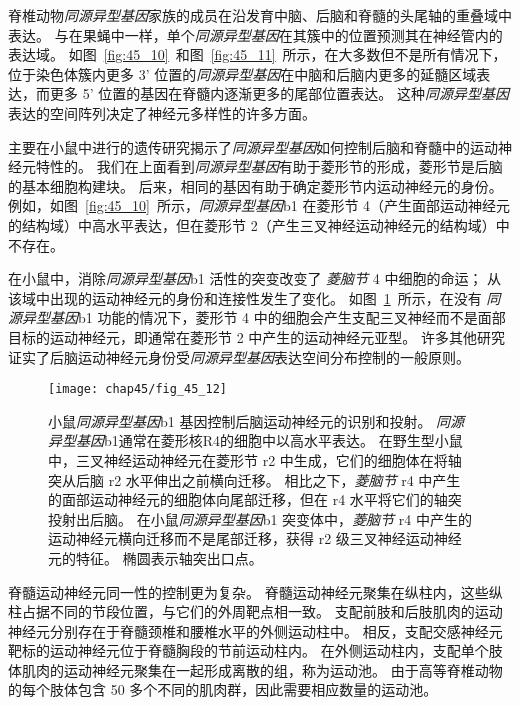 脊椎动物\textit{同源异型基因}家族的成员在沿发育中脑、后脑和脊髓的头尾轴的重叠域中表达。
与在果蝇中一样，单个\textit{同源异型基因}在其簇中的位置预测其在神经管内的表达域。
如图~\ref{fig:45_10}~和图~\ref{fig:45_11}~所示，在大多数但不是所有情况下，位于染色体簇内更多 3' 位置的\textit{同源异型基因}在中脑和后脑内更多的延髓区域表达，而更多 5' 位置的基因在脊髓内逐渐更多的尾部位置表达。
这种\textit{同源异型基因}表达的空间阵列决定了神经元多样性的许多方面。


主要在小鼠中进行的遗传研究揭示了\textit{同源异型基因}如何控制后脑和脊髓中的运动神经元特性的。
我们在上面看到\textit{同源异型基因}有助于菱形节的形成，菱形节是后脑的基本细胞构建块。
后来，相同的基因有助于确定菱形节内运动神经元的身份。
例如，如图~\ref{fig:45_10}~所示，\textit{同源异型基因}b1 在菱形节 4（产生面部运动神经元的结构域）中高水平表达，但在菱形节 2（产生三叉神经运动神经元的结构域）中不存在。


在小鼠中，消除\textit{同源异型基因}b1 活性的突变改变了 \textit{菱脑节} 4 中细胞的命运；
从该域中出现的运动神经元的身份和连接性发生了变化。 
如图~\ref{fig:45_12}~所示，在没有 \textit{同源异型基因}b1 功能的情况下，菱形节 4 中的细胞会产生支配三叉神经而不是面部目标的运动神经元，即通常在菱形节 2 中产生的运动神经元亚型。
许多其他研究证实了后脑运动神经元身份受\textit{同源异型基因}表达空间分布控制的一般原则。


\begin{figure}[htbp]
	\centering
	\texttt{[image: chap45/fig\_45\_12]}
	\caption{小鼠\textit{同源异型基因}b1 基因控制后脑运动神经元的识别和投射。
		\textit{同源异型基因}b1通常在菱形核R4的细胞中以高水平表达。
		在野生型小鼠中，三叉神经运动神经元在菱形节 r2 中生成，它们的细胞体在将轴突从后脑 r2 水平伸出之前横向迁移。
		相比之下，\textit{菱脑节} r4 中产生的面部运动神经元的细胞体向尾部迁移，但在 r4 水平将它们的轴突投射出后脑。
		在小鼠\textit{同源异型基因}b1 突变体中，\textit{菱脑节} r4 中产生的运动神经元横向迁移而不是尾部迁移，获得 r2 级三叉神经运动神经元的特征。
		椭圆表示轴突出口点\cite{studer1996altered}。}
	\label{fig:45_12}
\end{figure}


脊髓运动神经元同一性的控制更为复杂。
脊髓运动神经元聚集在纵柱内，这些纵柱占据不同的节段位置，与它们的外周靶点相一致。
支配前肢和后肢肌肉的运动神经元分别存在于脊髓颈椎和腰椎水平的外侧运动柱中。
相反，支配交感神经元靶标的运动神经元位于脊髓胸段的节前运动柱内。
在外侧运动柱内，支配单个肢体肌肉的运动神经元聚集在一起形成离散的组，称为运动池。
由于高等脊椎动物的每个肢体包含 50 多个不同的肌肉群，因此需要相应数量的运动池。


